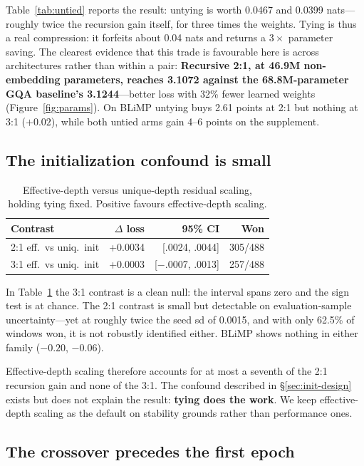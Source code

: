 \documentclass[11pt]{article}
\begin{document}
Table~\ref{tab:untied} reports the result: untying is worth 0.0467 and 0.0399 nats---roughly twice the recursion gain itself, for three times the weights. Tying is thus a real compression: it forfeits about 0.04 nats and returns a $3\times$ parameter saving. The clearest evidence that this trade is favourable here is across architectures rather than within a pair: \textbf{Recursive 2:1, at 46.9M non-embedding parameters, reaches 3.1072 against the 68.8M-parameter GQA baseline's 3.1244}---better loss with 32\% fewer learned weights (Figure~\ref{fig:params}). On BLiMP untying buys 2.61 points at 2:1 but nothing at 3:1 ($+0.02$), while both untied arms gain 4--6 points on the supplement.

\subsection{The initialization confound is small}
\label{sec:init}

\begin{table}[t]
\centering
\footnotesize
\setlength{\tabcolsep}{4pt}
\begin{tabular}{lrrr}
\toprule
Contrast & $\Delta$ loss & 95\% CI & Won \\
\midrule
2:1 eff.\ vs uniq.\ init & +0.0034 & [.0024, .0044] & 305/488 \\
3:1 eff.\ vs uniq.\ init & +0.0003 & [$-$.0007, .0013] & 257/488 \\
\bottomrule
\end{tabular}
\caption{Effective-depth versus unique-depth residual scaling, holding tying fixed. Positive favours effective-depth scaling.}
\label{tab:init}
\end{table}

In Table~\ref{tab:init} the 3:1 contrast is a clean null: the interval spans zero and the sign test is at chance. The 2:1 contrast is small but detectable on evaluation-sample uncertainty---yet at roughly twice the seed sd of 0.0015, and with only 62.5\% of windows won, it is not robustly identified either. BLiMP shows nothing in either family ($-0.20$, $-0.06$).

Effective-depth scaling therefore accounts for at most a seventh of the 2:1 recursion gain and none of the 3:1. The confound described in \S\ref{sec:init-design} exists but does not explain the result: \textbf{tying does the work}. We keep effective-depth scaling as the default on stability grounds rather than performance ones.

\subsection{The crossover precedes the first epoch}
\label{sec:crossover}
\end{document}
